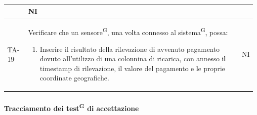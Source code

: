 \documentclass[8pt]{article}
\newcommand{\glossterm}[1]{#1\textsuperscript{G}} %
\newcommand{\subsubsubsection}[1]{\paragraph{#1}\mbox{}\\\\}
\begin{document}
\begin{longtable}{|>{\centering}p{2cm}|>{\RaggedRight}m{12cm}|>{\centering\arraybackslash}p{2cm}|}
\begin{enumerate}
    \end{enumerate}
    & NI \\
    \hline
    TA-19 &
    Verificare che un \glossterm{sensore}, una volta connesso al \glossterm{sistema}, possa:
    \begin{enumerate}
    \item Inserire il risultato della rilevazione di avvenuto pagamento dovuto all'utilizzo di una colonnina di ricarica, con annesso il timestamp di rilevazione, il valore del pagamento e le proprie coordinate geografiche. 
    \end{enumerate}
    & NI \\
    \hline
\end{longtable}
\clearpage
\subsubsubsection{Tracciamento dei \glossterm{test} di accettazione}
\renewcommand{\arraystretch}{2.5}
\end{document}
